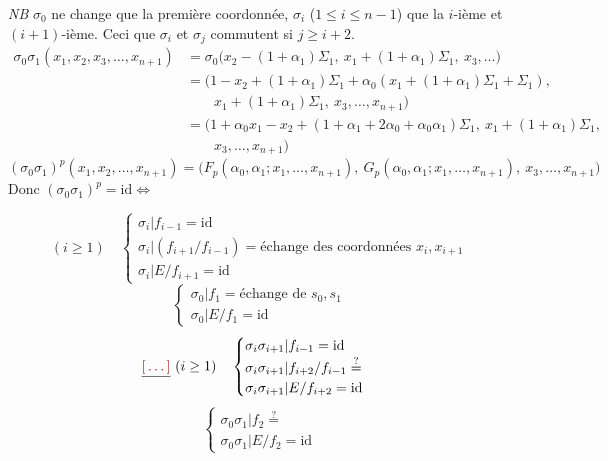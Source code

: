 \documentclass[11pt,a4paper]{article}
\begin{document}
\emph{NB} $\sigma_0$ ne change que la première coordonnée, $\sigma_i$ ($1\leq i\leq n-1$) que la $i$-ième et $(i+1)$-ième. Ceci \struck{\ill{}}  que $\sigma_i$ et $\sigma_j$ commutent si $j\geq i+2$.
\[
\begin{aligned}
\sigma_0\sigma_1(x_1,x_2,x_3,\dots,x_{n+1}) &= \sigma_0\bigl(x_2-(1+\alpha_1)\Sigma_1,\ x_1+(1+\alpha_1)\Sigma_1,\ x_3,\dots\bigr) \\
&= \bigl(1-x_2+(1+\alpha_1)\Sigma_1+\alpha_0(x_1+(1+\alpha_1)\Sigma_1+\Sigma_1), \\
&\qquad x_1+(1+\alpha_1)\Sigma_1,\ x_3,\dots,x_{n+1}\bigr) \\
&= \bigl(1+\alpha_0x_1-x_2+(1+\alpha_1+2\alpha_0+\alpha_0\alpha_1)\Sigma_1,\ x_1+(1+\alpha_1)\Sigma_1, \\
&\qquad x_3,\dots,x_{n+1}\bigr)
\end{aligned}
\]
\[
(\sigma_0\sigma_1)^p(x_1,x_2,\dots,x_{n+1}) = \bigl(F_p(\alpha_0,\alpha_1;x_1,\dots,x_{n+1}),\ G_p(\alpha_0,\alpha_1;x_1,\dots,x_{n+1}),\ x_3,\dots,x_{n+1}\bigr)
\]
Donc $(\sigma_0\sigma_1)^p = \mathrm{id} \iff$

\[
(i\geq 1)\quad
\begin{cases}
\sigma_i|f_{i-1} = \mathrm{id} \\
\sigma_i|(f_{i+1}/f_{i-1}) = \text{échange des coordonnées } x_i,x_{i+1} \\
\sigma_i|E/f_{i+1} = \mathrm{id}
\end{cases}
\]
\[
\begin{cases}
\sigma_0|f_1 = \text{échange de } s_0,s_1 \\
\sigma_0|E/f_1 = \mathrm{id}
\end{cases}
\]
\[
\struck{\ill{}}\ (i\geq 1)\quad
\begin{cases}
\sigma_i\sigma_{i+1}|f_{i-1} = \mathrm{id} \\
\sigma_i\sigma_{i+1}|f_{i+2}/f_{i-1} \overset{?}{=} \\
\sigma_i\sigma_{i+1}|E/f_{i+2} = \mathrm{id}
\end{cases}
\]
\[
\begin{cases}
\sigma_0\sigma_1|f_2 \overset{?}{=} \\
\sigma_0\sigma_1|E/f_2 = \mathrm{id}
\end{cases}
\]
\end{document}
